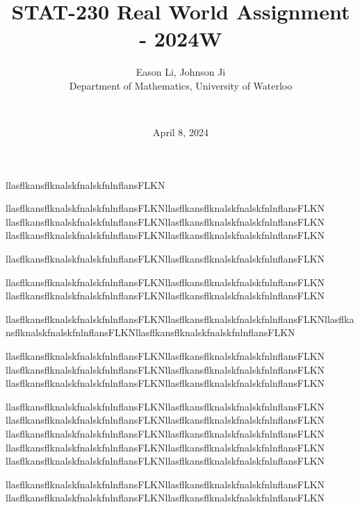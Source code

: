 \documentclass[final]{beamer}
\title{STAT-230 Real World Assignment - 2024W}
\author{
    Eason Li, Johnson Ji \\
    Department of Mathematics, University of Waterloo \and \\
}
\date{April 8, 2024} %
\begin{document}
\maketitle


\begin{minipage}{.5\textwidth}
    llasflkansflknalskfnalskfnlnflansFLKN
\end{minipage} 

\begin{minipage}{0.5\textwidth}
    llasflkansflknalskfnalskfnlnflansFLKNllasflkansflknalskfnalskfnlnflansFLKN
    llasflkansflknalskfnalskfnlnflansFLKNllasflkansflknalskfnalskfnlnflansFLKN
    llasflkansflknalskfnalskfnlnflansFLKNllasflkansflknalskfnalskfnlnflansFLKN

    llasflkansflknalskfnalskfnlnflansFLKNllasflkansflknalskfnalskfnlnflansFLKN



    llasflkansflknalskfnalskfnlnflansFLKNllasflkansflknalskfnalskfnlnflansFLKN
    llasflkansflknalskfnalskfnlnflansFLKNllasflkansflknalskfnalskfnlnflansFLKN

    llasflkansflknalskfnalskfnlnflansFLKNllasflkansflknalskfnalskfnlnflansFLKNllasflkansflknalskfnalskfnlnflansFLKNllasflkansflknalskfnalskfnlnflansFLKN

    llasflkansflknalskfnalskfnlnflansFLKNllasflkansflknalskfnalskfnlnflansFLKN
    llasflkansflknalskfnalskfnlnflansFLKNllasflkansflknalskfnalskfnlnflansFLKN
    llasflkansflknalskfnalskfnlnflansFLKNllasflkansflknalskfnalskfnlnflansFLKN

    llasflkansflknalskfnalskfnlnflansFLKNllasflkansflknalskfnalskfnlnflansFLKN
    llasflkansflknalskfnalskfnlnflansFLKNllasflkansflknalskfnalskfnlnflansFLKN
    llasflkansflknalskfnalskfnlnflansFLKNllasflkansflknalskfnalskfnlnflansFLKN
    llasflkansflknalskfnalskfnlnflansFLKNllasflkansflknalskfnalskfnlnflansFLKN
    llasflkansflknalskfnalskfnlnflansFLKNllasflkansflknalskfnalskfnlnflansFLKN


    llasflkansflknalskfnalskfnlnflansFLKNllasflkansflknalskfnalskfnlnflansFLKN
    llasflkansflknalskfnalskfnlnflansFLKNllasflkansflknalskfnalskfnlnflansFLKN
\end{minipage}
\end{document}
